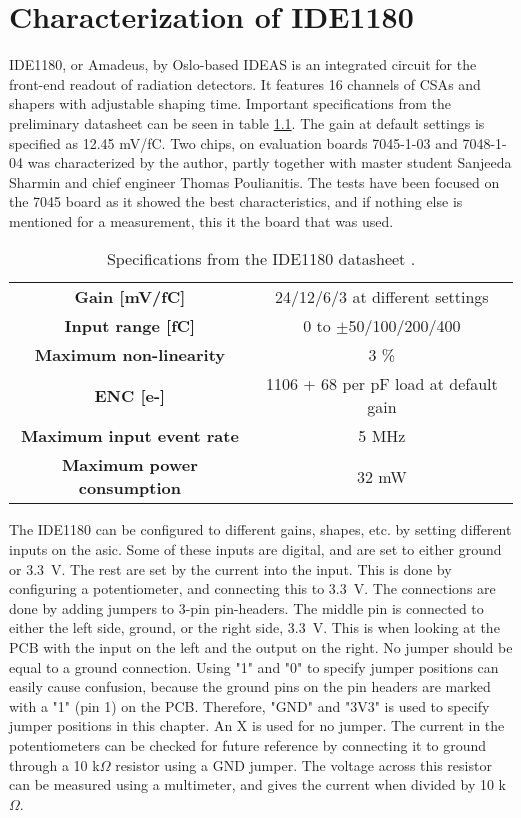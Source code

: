 \documentclass[../main/thesis.tex]{subfiles}
\begin{document}
\newpage

\chapter{Characterization of IDE1180}
\label{ide}

IDE1180, or Amadeus, by Oslo-based IDEAS is an integrated circuit for the front-end readout of radiation detectors. It features 16 channels of \gls{CSA}s and shapers with adjustable shaping time. Important specifications from the preliminary datasheet can be seen in table \ref{tab-ide-specs}. The gain at default settings is specified as 12.45 mV/fC. Two chips, on evaluation boards 7045-1-03 and 7048-1-04 was characterized by the author, partly together with master student Sanjeeda Sharmin and chief engineer Thomas Poulianitis. The tests have been focused on the 7045 board as it showed the best characteristics, and if nothing else is mentioned for a measurement, this it the board that was used. 

\begin{table}[h!]
	\begin{center}
		\caption{Specifications from the IDE1180 datasheet \citep{IDE1180}.}
		\label{tab-ide-specs}
		\begin{tabular}{cc}\toprule
			\textbf{Gain [mV/fC]} & 24/12/6/3 at different settings  \\ 
			\textbf{Input range [fC]}     & 0 to $\pm$50/100/200/400  \\
			\textbf{Maximum non-linearity}	&	3 \%	\\
			\textbf{\gls{ENC} [e-]}		& 	1106 + 68 per pF load at default gain \\
			\textbf{Maximum input event rate}	&	5 MHz	\\
			\textbf{Maximum power consumption}	&	32 mW	\\
			 \bottomrule
		\end{tabular}
	\end{center}
\end{table}

The IDE1180 can be configured to different gains, shapes, etc. by setting different inputs on the \gls{asic}. Some of these inputs are digital, and are set to either ground or 3.3~V. The rest are set by the current into the input. This is done by configuring a potentiometer, and connecting this to 3.3~V. The connections are done by adding jumpers to 3-pin pin-headers. The middle pin is connected to either the left side, ground, or the right side, 3.3~V. This is when looking at the \gls{PCB} with the input on the left and the output on the right. No jumper should be equal to a ground connection. Using "1" and "0" to specify jumper positions can easily cause confusion, because the ground pins on the pin headers are marked with a "1" (pin 1) on the \gls{PCB}. Therefore, "GND" and "3V3" is used to specify jumper positions in this chapter.  An X is used for no jumper. The current in the potentiometers can be checked for future reference by connecting it to ground through a 10 k$\Omega$ resistor using a GND jumper. The voltage across this resistor can be measured using a multimeter, and gives the current when divided by 10 k$\Omega$. 
\end{document}
